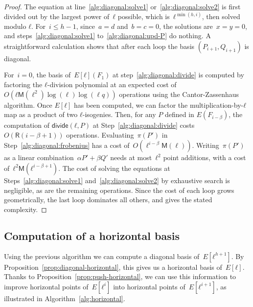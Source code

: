 \documentclass{lms}
\def\cout#1{\mathsf{#1}}
\def\sfdiv{\mathsf{divide}}
\newcommand{\MM}{\cout{M}}
\newcommand{\RR}{\cout{R}}
\begin{document}
\begin{proof}
The equation at line~\ref{alg:diagonal:solve1} or~\ref{alg:diagonal:solve2}
is first divided out by the largest power of~$ℓ$ possible,
which is~$ℓ^{\min (h, i)}$, then solved modulo $ℓ$.
For~$i ≤ h-1$, since~$a = d$ and~$b = c = 0$,
the solutions are~$x = y = 0$, and
steps~\ref{alg:diagonal:solve1} to~\ref{alg:diagonal:upd-P} do nothing.
A straightforward calculation shows that after each loop the basis
$(P_{i+1},Q_{i+1})$ is diagonal.

For~$i = 0$, the basis of~$E[ℓ](F_1)$ at step~\ref{alg:diagonal:divide}
is computed by factoring the $ℓ$-division polynomial
at an expected cost of $O(ℓ\MM(\ell^2)\log(\ell)\log(\ell q))$
operations using the Cantor-Zassenhaus algorithm.
  Once $E[ℓ]$ has been computed, we can factor the
  multiplication-by-$ℓ$ map as a product of two $ℓ$-isogenies. Then,
  for any $P$ defined in $E(F_{i-β})$, the computation of
  $\sfdiv(ℓ, P)$ at Step~\ref{alg:diagonal:divide} costs $O(\RR(i-β+1))$
  operations.
  Evaluating~$π(P')$ in Step~\ref{alg:diagonal:frobenius} has a cost
  of~$O(\ell^{i-\beta}\MM(\ell))$.
  Writing~$π(P')$ as a linear combination~$α P' + β Q'$ needs at
  most~$ℓ^2$ point additions, with a cost of~$ℓ^2
  \mathsf{M}(ℓ^{i-\beta+1})$.
  The cost of solving the equations at Steps~\ref{alg:diagonal:solve1}
  and~\ref{alg:diagonal:solve2} by exhaustive search is negligible, as
  are the remaining operations.  Since the cost of each loop grows
  geometrically, the last loop dominates all others, and gives the
  stated complexity.
\end{proof}

\subsection{Computation of a horizontal basis}
\label{ss:horizontal}

Using the previous algorithm
we can compute a diagonal basis of~$E[ℓ^{h+1}]$.
By Proposition~\ref{prop:diagonal-horizontal},
this gives us a horizontal basis of~$E[ℓ]$.
Thanks to Proposition~\ref{prop:push-horizontal},
we can use this information to improve horizontal points of~$E[ℓ^i]$
into horizontal points of~$E[ℓ^{i+1}]$, as illustrated in
Algorithm~\ref{alg:horizontal}.
\end{document}
